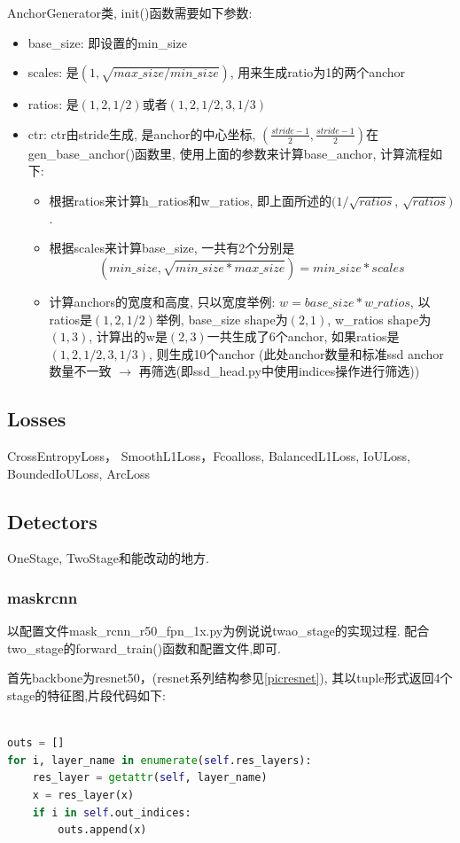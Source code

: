 \documentclass[UTF8]{ctexart}
\begin{document}
AnchorGenerator类, init()函数需要如下参数:

\begin{itemize}
	\item base\_size: 即设置的min\_size
	\item scales: 是$(1, \sqrt{max\_size / min\_size})$, 用来生成ratio为1的两个anchor
	\item ratios: 是$(1, 2, 1/2)$或者$(1, 2, 1/2, 3, 1/3)$
	\item ctr: ctr由stride生成, 是anchor的中心坐标, $(\frac{stride - 1}{2}, \frac{stride - 1}{2} ) $在gen\_base\_anchor()函数里, 使用上面的参数来计算base\_anchor, 计算流程如下:
	\begin{itemize}
		\item 根据ratios来计算h\_ratios和w\_ratios, 即上面所述的$(1 / \sqrt{ratios}$, $\sqrt{ratios}) $.
		\item 根据scales来计算base\_size, 一共有2个分别是$$(min\_size, \sqrt{min\_size * max\_size}) = min\_size * scales$$
		\item 计算anchors的宽度和高度, 只以宽度举例: $w = base\_size * w\_ratios$, 以ratios是$(1, 2, 1/2)$举例, base\_size shape为$(2, 1)$, w\_ratios shape为$(1, 3)$, 
		计算出的w是$(2, 3) $一共生成了6个anchor, 如果ratios是$(1, 2, 1/2, 3, 1/3)$, 则生成10个anchor (此处anchor数量和标准ssd anchor数量不一致 $\rightarrow$
		 再筛选(即ssd\_head.py中使用indices操作进行筛选))
	\end{itemize}
	
\end{itemize}

\subsection{Losses}
CrossEntropyLoss， SmoothL1Loss，Fcoalloss, BalancedL1Loss, IoULoss,
BoundedIoULoss, ArcLoss


\subsection{Detectors}
OneStage, TwoStage和能改动的地方.

\subsubsection{maskrcnn}
以配置文件mask\_rcnn\_r50\_fpn\_1x.py为例说说twao\_stage的实现过程.
配合two\_stage的forward\_train()函数和配置文件,即可.

首先backbone为resnet50，(resnet系列结构参见\ref{picresnet}),
其以tuple形式返回4个stage的特征图,片段代码如下:
\lstset{style=mystyle}
\begin{lstlisting}[language=Python]

outs = []
for i, layer_name in enumerate(self.res_layers):
	res_layer = getattr(self, layer_name)
	x = res_layer(x)
	if i in self.out_indices:
		outs.append(x)

\end{lstlisting}
\end{document}
